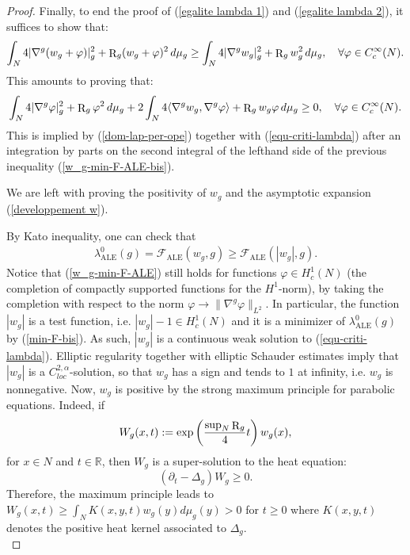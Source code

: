 \documentclass[a4paper,11pt,reqno]{amsart}
\def\RR{\mathbb{R}}
\def\R{\mathop{\rm R}\nolimits}
\numberwithin{equation}{section}
\begin{document}
\begin{proof}
		Finally, to end the proof of (\ref{egalite lambda 1}) and (\ref{egalite lambda 2}), it suffices to show that:
		\begin{equation}
		\int_N4|\nabla^g(w_g+\varphi)|^2_g+\R_g(w_g+\varphi)^2\,d\mu_g\geq \int_N4|\nabla^gw_g|^2_g+\R_gw_g^2\,d\mu_g, \quad \forall \varphi\in C^{\infty}_{c}(N).\label{w_g-min-F-ALE}
		\end{equation}
		This amounts to proving that:
		\begin{equation}
		\int_N4|\nabla^g\varphi|^2_g+\R_g\varphi^2\,d\mu_g+2\int_N4\langle\nabla^gw_g,\nabla^g\varphi\rangle+\R_gw_g\varphi \,d\mu_g\geq 0,\quad\forall \varphi\in C^{\infty}_{c}(N).\label{w_g-min-F-ALE-bis}
		\end{equation}
		This is implied by (\ref{dom-lap-per-ope}) together with (\ref{equ-criti-lambda}) after an integration by parts on the second integral of the lefthand side of the previous inequality (\ref{w_g-min-F-ALE-bis}).
		
		We are left with proving the positivity of $w_g$ and the asymptotic expansion (\ref{developpement w}). 
		
		By Kato inequality, one can check that 
		\begin{eqnarray}
		\lambda_{\operatorname{ALE}}^0(g)=\mathcal{F}_{\operatorname{ALE}}(w_g,g)\geq \mathcal{F}_{\operatorname{ALE}}(|w_g|,g).\label{min-F-bis}
		\end{eqnarray}
		Notice that (\ref{w_g-min-F-ALE}) still holds for functions $\varphi\in H_c^1(N)$ (the completion of compactly supported functions for the $H^1$-norm), by taking the completion with respect to the norm $\varphi\rightarrow\|\nabla^g\varphi\|_{L^2}$. In particular, the function $|w_g|$ is a test function, i.e. $|w_g|-1\in H_c^1(N)$ and it is a minimizer of $\lambda_{\operatorname{ALE}}^0(g)$ by (\ref{min-F-bis}). As such, $|w_g|$ is a continuous weak solution to (\ref{equ-criti-lambda}). Elliptic regularity together with elliptic Schauder estimates imply that $|w_g|$ is a $C^{2,\alpha}_{loc}$-solution, so that $w_g$ has a sign and tends to $1$ at infinity, i.e. $w_g$ is nonnegative. Now, $w_g$ is positive by the strong maximum principle for parabolic equations. Indeed, if $$W_g(x,t):=\exp\left(\frac{\sup_N\R_g}{4} t\right)w_g(x),$$ for $x\in N$ and $t\in\RR$, then $W_g$ is a super-solution to the heat equation: 
		\begin{equation*}
		\left(\partial_t-\Delta_g\right)W_g\geq 0.
		\end{equation*}
		Therefore, the maximum principle leads to $W_g(x,t)\geq \int_NK(x,y,t)w_g(y)d\mu_g(y)>0$ for $t\geq 0$ where $K(x,y,t)$ denotes the positive heat kernel associated to $\Delta_g$.\\
		

\end{proof}
\end{document}
